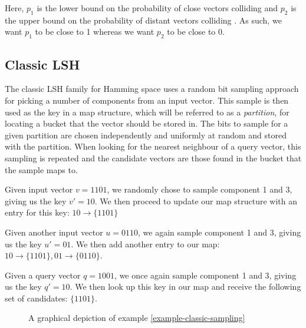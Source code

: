 Here, $p_1$ is the lower bound on the probability of close vectors colliding and $p_2$ is the upper bound on the probability of distant vectors colliding \cite[p. 100]{DBLP:books/cu/LeskovecRU14}. As such, we want $p_1$ to be close to 1 whereas we want $p_2$ to be close to 0.

\subsection{Classic LSH}
\label{background-classic-lsh}

The classic LSH family for Hamming space uses a random bit sampling approach for picking a number of components from an input vector. This sample is then used as the key in a map structure, which will be referred to as a \textit{partition}, for locating a bucket that the vector should be stored in. The bits to sample for a given partition are chosen independently and uniformly at random and stored with the partition. When looking for the nearest neighbour of a query vector, this sampling is repeated and the candidate vectors are those found in the bucket that the sample maps to.

\begin{example}
\label{example-classic-sampling}
  Given input vector $v = 1101$, we randomly chose to sample component 1 and 3, giving us the key $v' = 10$. We then proceed to update our map structure with an entry for this key: $10 \rightarrow \{1101\}$

  Given another input vector $u = 0110$, we again sample component 1 and 3, giving us the key $u' = 01$. We then add another entry to our map: $10 \rightarrow \{1101\}, 01 \rightarrow \{0110\}$.

  Given a query vector $q = 1001$, we once again sample component 1 and 3, giving us the key $q' = 10$. We then look up this key in our map and receive the following set of candidates: $\{1101\}$.
\end{example}

\begin{figure}[ht]
  \centering

  \caption{A graphical depiction of example \ref{example-classic-sampling}}
  \label{figure-classic-sampling}
\end{figure}

